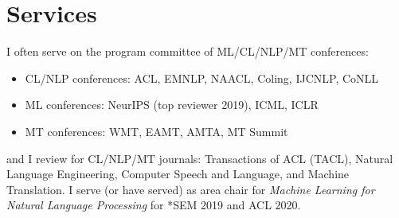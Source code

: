 

\section*{Services}

I often serve on the program committee of ML/CL/NLP/MT conferences:
\begin{itemize}\setlength\itemsep{0pt}
	\item CL/NLP conferences: ACL, EMNLP, NAACL, Coling, IJCNLP, CoNLL
	\item ML conferences: NeurIPS (top reviewer 2019), ICML, ICLR
	\item MT conferences: WMT, EAMT, AMTA, MT Summit
\end{itemize}
and I review for CL/NLP/MT journals: Transactions of ACL (TACL), Natural Language Engineering, Computer Speech and Language, and Machine Translation. I serve (or have served) as area chair for \emph{Machine Learning for Natural Language Processing} for *SEM 2019 and ACL 2020.


